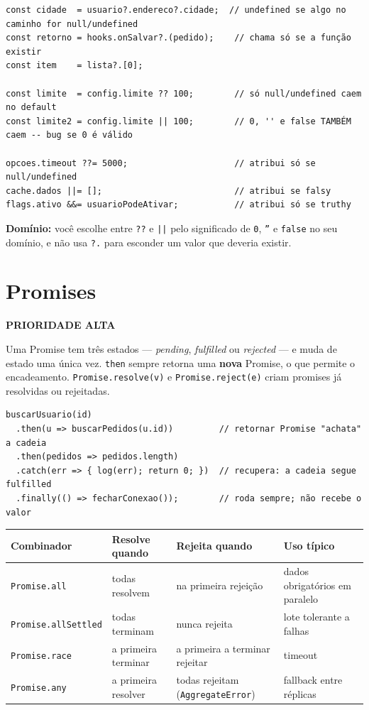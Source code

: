 \documentclass[12pt,a4paper,oneside]{book}
\newcommand{\alta}{\colorbox{red!15}{\sffamily\scriptsize\bfseries PRIORIDADE ALTA}}
\newcommand{\code}[1]{\texttt{#1}}
\newcommand{\dom}[1]{\begin{dominio}\textbf{Domínio:} #1\end{dominio}}
\begin{document}
\begin{verbatim}
const cidade  = usuario?.endereco?.cidade;  // undefined se algo no caminho for null/undefined
const retorno = hooks.onSalvar?.(pedido);    // chama só se a função existir
const item    = lista?.[0];

const limite  = config.limite ?? 100;        // só null/undefined caem no default
const limite2 = config.limite || 100;        // 0, '' e false TAMBÉM caem -- bug se 0 é válido

opcoes.timeout ??= 5000;                     // atribui só se null/undefined
cache.dados ||= [];                          // atribui se falsy
flags.ativo &&= usuarioPodeAtivar;           // atribui só se truthy
\end{verbatim}

\dom{você escolhe entre \code{??} e \code{||} pelo significado de \code{0}, \code{''} e \code{false} no seu domínio, e não usa \code{?.} para esconder um valor que deveria existir.}

\section{Promises}
\label{sec:promises}
\alta

Uma Promise tem três estados --- \emph{pending}, \emph{fulfilled} ou \emph{rejected} --- e muda de estado uma única vez. \code{then} sempre retorna uma \textbf{nova} Promise, o que permite o encadeamento. \code{Promise.resolve(v)} e \code{Promise.reject(e)} criam promises já resolvidas ou rejeitadas.

\begin{verbatim}
buscarUsuario(id)
  .then(u => buscarPedidos(u.id))         // retornar Promise "achata" a cadeia
  .then(pedidos => pedidos.length)
  .catch(err => { log(err); return 0; })  // recupera: a cadeia segue fulfilled
  .finally(() => fecharConexao());        // roda sempre; não recebe o valor
\end{verbatim}

{\small
\begin{tabularx}{\textwidth}{@{}lXXX@{}}
\toprule
\textbf{Combinador} & \textbf{Resolve quando} & \textbf{Rejeita quando} & \textbf{Uso típico} \\
\midrule
\code{Promise.all} & todas resolvem & na primeira rejeição & dados obrigatórios em paralelo \\
\code{Promise.allSettled} & todas terminam & nunca rejeita & lote tolerante a falhas \\
\code{Promise.race} & a primeira terminar & a primeira a terminar rejeitar & timeout \\
\code{Promise.any} & a primeira resolver & todas rejeitam (\code{AggregateError}) & fallback entre réplicas \\
\bottomrule
\end{tabularx}
}
\end{document}

